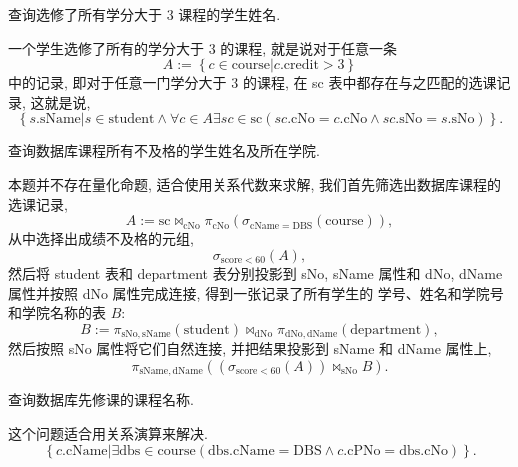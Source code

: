 \documentclass[10pt,UTF8]{book} %
\begin{document}
\begin{example}
    查询选修了所有学分大于 $3$ 课程的学生姓名.
    \begin{sol}
        一个学生选修了所有的学分大于 $3$ 的课程, 就是说对于任意一条
        \[ A := \left\{ c \in \mathrm{course} | 
        c.\mathrm{credit} > 3 \right\} \]
        中的记录, 即对于任意一门学分大于 $3$ 的课程,
        在 sc 表中都存在与之匹配的选课记录, 这就是说,
        \[ \left\{ s.\mathrm{sName} | 
        s \in \mathrm{student}
        \wedge \forall c \in A \exists sc \in \mathrm{sc} \left(
            sc.\mathrm{cNo} = c.\mathrm{cNo}
            \wedge sc.\mathrm{sNo} = s.\mathrm{sNo}
        \right)\right\}. \]
    \end{sol}
\end{example}

\begin{example}
    查询数据库课程所有不及格的学生姓名及所在学院.
    \begin{sol}
        本题并不存在量化命题, 适合使用关系代数来求解, 
        我们首先筛选出数据库课程的选课记录,
        \[ A := \mathrm{sc} \Join_\mathrm{cNo} 
        \pi_\mathrm{cNo}(\sigma_\mathrm{cName = DBS}(\mathrm{course})), \]
        从中选择出成绩不及格的元组,
        \[ \sigma_\mathrm{score < 60} \left(A\right), \]
        然后将 student 表和 department 表分别投影到 sNo, sName 属性和
        dNo, dName 属性并按照 dNo 属性完成连接, 得到一张记录了所有学生的
        学号、姓名和学院号和学院名称的表 $B$:
        \[ B := \pi_\mathrm{sNo, sName}(\mathrm{student})
        \Join_\mathrm{dNo} \pi_\mathrm{dNo, dName} \left(
            \mathrm{department}
        \right), \]
        然后按照 sNo 属性将它们自然连接, 并把结果投影到 sName 和 dName 属性上,
        \[ \pi_\mathrm{sName, dName} \left(
            \left(\sigma_\mathrm{score < 60} \left(A\right)\right)
        \Join_\mathrm{sNo} B
        \right). \]
    \end{sol}
\end{example}

\newpage
\begin{example}
    查询数据库先修课的课程名称.
    \begin{sol}
        这个问题适合用关系演算来解决.
        \[ \left\{c.\mathrm{cName} | 
        \exists \mathrm{dbs} \in \mathrm{course} \left(
            \mathrm{dbs}.\mathrm{cName} = \mathrm{DBS}
            \wedge c.\mathrm{cPNo} = \mathrm{dbs}.\mathrm{cNo}
        \right)\right\}. \]
    \end{sol}
\end{example}
\end{document}
